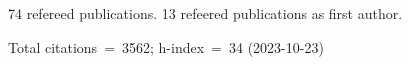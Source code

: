 74 refereed publications. 13 refeered publications as first author.

Total citations~=~3562; h-index~=~34 (2023-10-23)
